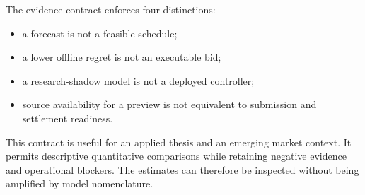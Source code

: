The evidence contract enforces four distinctions:

\begin{itemize}
\item a forecast is not a feasible schedule;
\item a lower offline regret is not an executable bid;
\item a research-shadow model is not a deployed controller;
\item source availability for a preview is not equivalent to submission and settlement readiness.
\end{itemize}

This contract is useful for an applied thesis and an emerging market context. It permits descriptive quantitative comparisons while retaining negative evidence and operational blockers. The estimates can therefore be inspected without being amplified by model nomenclature.
